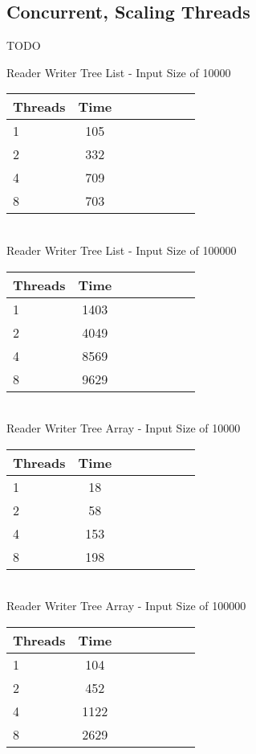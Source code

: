 \documentclass{sig-alternate}
\begin{document}
\subsection{Concurrent, Scaling Threads}
TODO

Reader Writer Tree List - Input Size of 10000 \\
\begin{tabular}{| l | c | c | c | c | c | c | r}
  \hline
  Threads & Time \\ \hline
  1 & 105 \\
  2 & 332 \\
  4 & 709 \\
  8 & 703 \\
  \hline
\end{tabular} \\

Reader Writer Tree List - Input Size of 100000 \\
\begin{tabular}{| l | c | c | c | c | c | c | r}
  \hline
  Threads & Time \\ \hline
  1 & 1403 \\
  2 & 4049 \\
  4 & 8569 \\
  8 & 9629 \\
  \hline
\end{tabular} \\

Reader Writer Tree Array - Input Size of 10000 \\
\begin{tabular}{| l | c | c | c | c | c | c | r}
  \hline
  Threads & Time \\ \hline
  1 & 18 \\
  2 & 58 \\
  4 & 153 \\
  8 & 198 \\
  \hline
\end{tabular} \\

Reader Writer Tree Array - Input Size of 100000 \\
\begin{tabular}{| l | c | c | c | c | c | c | r}
  \hline
  Threads & Time \\ \hline
  1 & 104 \\
  2 & 452 \\
  4 & 1122 \\
  8 & 2629 \\
  \hline
\end{tabular} \\
\end{document}
